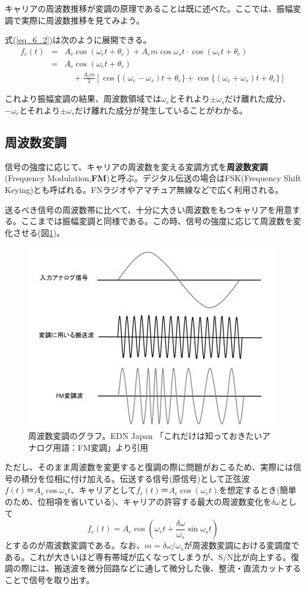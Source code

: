 キャリアの周波数推移が変調の原理であることは既に述べた。ここでは、振幅変調で実際に周波数推移を見てみよう。

式(\ref{eq_6_2})は次のように展開できる。
\begin{eqnarray}
f_c(t)&=&A_c\cos(\omega_ct+\theta_c)+A_cm\cos\omega_st\cdot\cos(\omega_ct+\theta_c) \nonumber \\
&=&A_c\cos(\omega_ct+\theta_c)\nonumber \\
&\ &\quad +\frac{A_cm}{2}\left[\cos\{(\omega_c-\omega_s)t+\theta_c\}+\cos\{(\omega_c+\omega_s)t+\theta_c\}\right] \label{eq_6_3}
\end{eqnarray}

これより振幅変調の結果、周波数領域では$\omega_c$とそれより$\pm\omega_s$だけ離れた成分、$-\omega_c$とそれより$\pm\omega_s$だけ離れた成分が発生していることがわかる。

\subsection{周波数変調}
信号の強度に応じて、キャリアの周波数を変える変調方式を\textbf{周波数変調}(Frequency Modulation,\textbf{FM})と呼ぶ。デジタル伝送の場合はFSK(Frequency Shift Keying)とも呼ばれる。FNラジオやアマチュア無線などで広く利用される。

送るべき信号の周波数帯に比べて、十分に大きい周波数をもつキャリアを用意する。ここまでは振幅変調と同様である。この時、信号の強度に応じて周波数を変化させる(図\ref{fig6_3})。

\begin{figure}[htb]
\centering
\includegraphics[width=0.6\linewidth,keepaspectratio,bb=0 0 422 307]{fig/fig6_3.jpg}
\caption{周波数変調のグラフ。EDN Japan 「これだけは知っておきたいアナログ用語：FM変調」より引用}\label{fig6_3}
\end{figure}

ただし、そのまま周波数を変更すると復調の際に問題がおこるため、実際には信号の積分を位相に付け加える。伝送する信号(原信号)として正弦波$f(t)＝A_s\cos\omega_st$、キャリアとして$f_c(t)＝A_c\cos(\omega_ct)$を想定するとき(簡単のため、位相項を省いている)、キャリアの許容する最大の周波数変化を$\delta \omega$として
\begin{equation}
f_c(t) = A_c \cos\left(\omega_c t+\frac{\delta \omega}{\omega_s}\sin\omega_s t\right) \label{eq_6_4}
\end{equation}
とするのが周波数変調である。なお、$m=\delta \omega/\omega_s$が周波数変調における変調度である。これが大きいほど専有帯域が広くなってしまうが、S/N比が向上する。復調の際には、搬送波を微分回路などに通して微分した後、整流・直流カットすることで信号を取り出す。

